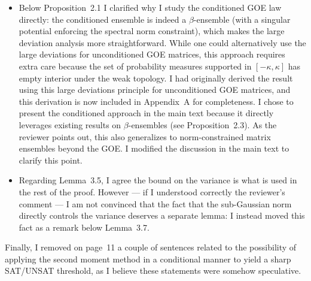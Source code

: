 \documentclass[a4paper,11pt]{article}
\begin{document}
\begin{itemize}
    \item Below Proposition~2.1 I clarified why I study the conditioned GOE law directly: 
    the conditioned ensemble is indeed a $\beta$-ensemble (with a singular potential enforcing the spectral norm constraint), 
    which makes the large deviation analysis more straightforward. 
    While one could alternatively use the large deviations for unconditioned GOE matrices, 
    this approach requires extra care because the set of probability measures supported in $[-\kappa, \kappa]$ has empty interior under the weak topology. 
    I had originally derived the result using this large deviations principle for unconditioned GOE matrices, and this derivation is now included in Appendix~A for completeness. 
    I chose to present the conditioned approach in the main text because it directly leverages existing results on $\beta$-ensembles (see Proposition~2.3). 
    As the reviewer points out, this
    also generalizes to norm-constrained matrix ensembles beyond the GOE. 
    I modified the discussion in the main text to clarify this point.
    \item Regarding Lemma~3.5, I agree the bound on the variance is what is used in the rest of the proof. 
    However --- if I understood correctly the reviewer's comment --- I am not convinced that the fact that the sub-Gaussian norm directly controls the variance 
    deserves a separate lemma: I instead moved this fact as a remark below Lemma~3.7.
\end{itemize}
Finally, I removed on page~11 a couple of sentences related to the possibility of applying 
the second moment method in a conditional manner to yield a sharp SAT/UNSAT threshold, 
as I believe these statements were somehow speculative. 
\end{document}
